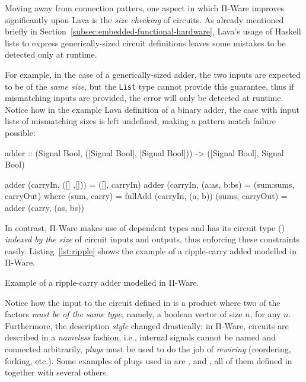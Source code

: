         Moving away from connection patters, one aspect in which Π-Ware improves significantly
        upon Lava is the \emph{size checking} of circuits.
        As already mentioned briefly in Section~\ref{subsec:embedded-functional-hardware},
        Lava's usage of Haskell lists to express generically-sized circuit definitions leaves some
        mistakes to be detected only at runtime.

        For example, in the case of a generically-sized adder, the two inputs are expected to be
        of the \emph{same size}, but the \texttt{List} type cannot provide this guarantee,
        thus if mismatching inputs are provided, the error will only be detected at runtime.
        Notice how in the example Lava definition of a binary adder,
        the case with input lists of mismatching sizes is left undefined,
        making a pattern match failure possible:

        \begin{haskellcode}
        adder :: (Signal Bool, ([Signal Bool], [Signal Bool]))
              -> ([Signal Bool], Signal Bool)

        adder (carryIn, ([] ,[]))    = ([], carryIn)
        adder (carryIn, (a:as, b:bs) = (sum:sums, carryOut)
            where (sum, carry)     = fullAdd (carryIn, (a, b))
                  (sums, carryOut) = adder (carry, (as, bs))
        \end{haskellcode}

        In contrast, Π-Ware makes use of dependent types and has its circuit type ()
        \emph{indexed by the size} of circuit inputs and outputs, thus enforcing these constraints easily.
        Listing~\ref{lst:ripple} shows the example of a ripple-carry added modelled in Π-Ware.

        \begin{listing}[h]
            \caption{Example of a ripple-carry adder modelled in Π-Ware.\label{lst:ripple}}
        \end{listing}

        Notice how the input to the circuit defined in  is a product where two of the factors
        \emph{must be of the same type}, namely, a boolean vector of size $n$, for any $n$.
        Furthermore, the description \emph{style} changed drastically: in Π-Ware, circuits are described
        in a \emph{nameless} fashion, i.e., internal signals cannot be named and connected arbitrarily,
        \emph{plugs} must be used to do the job of \emph{rewiring} (reordering, forking, etc.).
        Some examples of plugs used in  are ,  and ,
        all of them defined in  together with several others.

